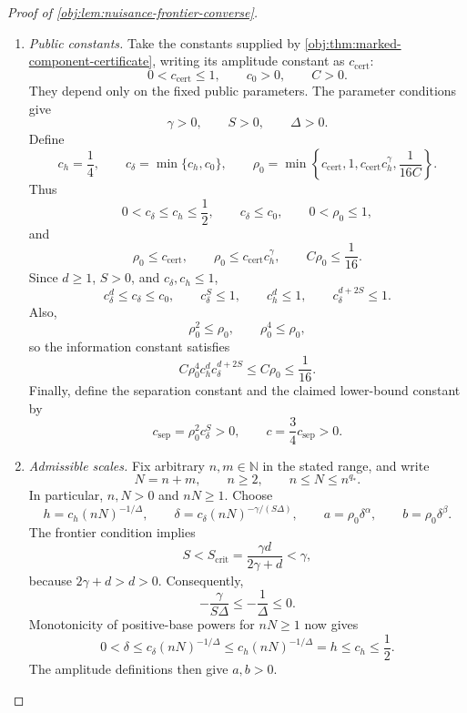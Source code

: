 \begin{proof}[Proof of \cref{obj:lem:nuisance-frontier-converse}]
\begin{enumerate}
\item \textit{Public constants.}
Take the constants supplied by \cref{obj:thm:marked-component-certificate}, writing its amplitude constant as \(c_{\mathrm{cert}}\):
\[
0<c_{\mathrm{cert}}\le1,\qquad c_0>0,\qquad C>0.
\]
They depend only on the fixed public parameters. The parameter conditions give
\[
\gamma>0,\qquad S>0,\qquad \Delta>0.
\]
Define
\[
c_h=\frac14,\qquad
c_\delta=\min\{c_h,c_0\},\qquad
\rho_0=\min\left\{
c_{\mathrm{cert}},1,c_{\mathrm{cert}}c_h^\gamma,
\frac1{16C}
\right\}.
\]
Thus
\[
0<c_\delta\le c_h\le\frac12,\qquad
c_\delta\le c_0,\qquad
0<\rho_0\le1,
\]
and
\[
\rho_0\le c_{\mathrm{cert}},\qquad
\rho_0\le c_{\mathrm{cert}}c_h^\gamma,\qquad
C\rho_0\le\frac1{16}.
\]
Since \(d\ge1\), \(S>0\), and \(c_\delta,c_h\le1\),
\[
c_\delta^d\le c_\delta\le c_0,\qquad
c_\delta^S\le1,\qquad
c_h^d\le1,\qquad
c_\delta^{d+2S}\le1.
\]
Also,
\[
\rho_0^2\le\rho_0,\qquad \rho_0^4\le\rho_0,
\]
so the information constant satisfies
\[
C\rho_0^4c_h^dc_\delta^{d+2S}
\le C\rho_0\le\frac1{16}.
\]
Finally, define the separation constant and the claimed lower-bound constant by
\[
c_{\mathrm{sep}}=\rho_0^2c_\delta^S>0,
\qquad
c=\frac34c_{\mathrm{sep}}>0.
\]

\item \textit{Admissible scales.}
Fix arbitrary \(n,m\in\mathbb N\) in the stated range, and write
\[
N=n+m,\qquad n\ge2,\qquad n\le N\le n^{q_*}.
\]
In particular, \(n,N>0\) and \(nN\ge1\). Choose
\[
h=c_h(nN)^{-1/\Delta},\qquad
\delta=c_\delta(nN)^{-\gamma/(S\Delta)},\qquad
a=\rho_0\delta^\alpha,\qquad
b=\rho_0\delta^\beta.
\]
The frontier condition implies
\[
S<S_{\mathrm{crit}}
=\frac{\gamma d}{2\gamma+d}<\gamma,
\]
because \(2\gamma+d>d>0\). Consequently,
\[
-\frac{\gamma}{S\Delta}\le-\frac1\Delta\le0.
\]
Monotonicity of positive-base powers for \(nN\ge1\) now gives
\[
0<\delta
\le c_\delta(nN)^{-1/\Delta}
\le c_h(nN)^{-1/\Delta}
=h
\le c_h\le\frac12.
\]
The amplitude definitions then give \(a,b>0\).


\end{enumerate}
\end{proof}
